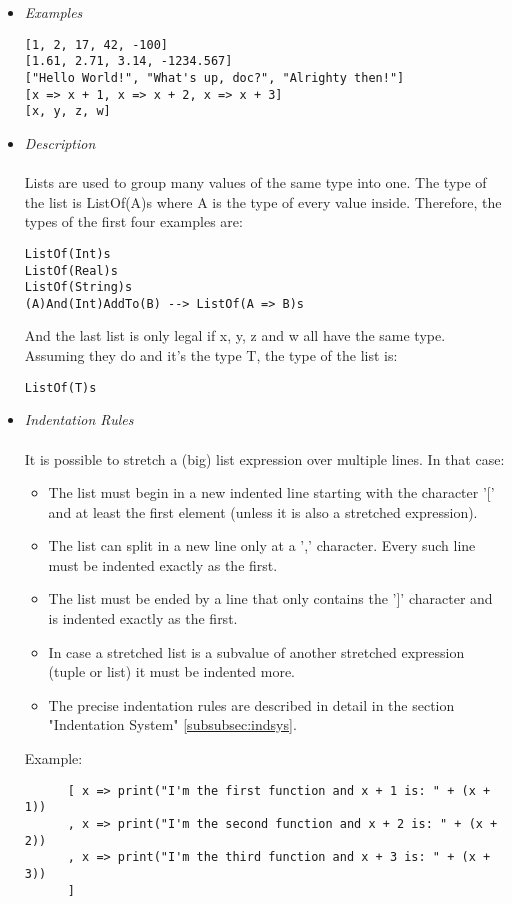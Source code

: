 \documentclass{article}
\begin{document}
\begin{itemize}

\item \textit{Examples}
\begin{verbatim}
[1, 2, 17, 42, -100]
[1.61, 2.71, 3.14, -1234.567]
["Hello World!", "What's up, doc?", "Alrighty then!"]
[x => x + 1, x => x + 2, x => x + 3]
[x, y, z, w]
\end{verbatim}

\item \textit{Description} \\\\
Lists are used to group many values of the same type into one. 
The type of the list is ListOf(A)s where A is the type of every value inside.
Therefore, the types of the first four examples are:
\begin{verbatim}
ListOf(Int)s
ListOf(Real)s
ListOf(String)s
(A)And(Int)AddTo(B) --> ListOf(A => B)s
\end{verbatim}
And the last list is only legal if x, y, z and w all have the same type. Assuming 
they do and it's the type T, the type of the list is: 
\begin{verbatim}
ListOf(T)s
\end{verbatim}

\item \textit{Indentation Rules} \\\\
It is possible to stretch a (big) list expression over multiple lines.
In that case:
\begin{itemize}
\item
The list must begin in a new indented line starting with the character '[' and 
at least the first element (unless it is also a stretched expression).

\item
The list can split in a new line only at a ',' character. Every such line must
be indented exactly as the first.

\item
The list must be ended by a line that only contains the ']' character and is 
indented exactly as the first.

\item
In case a stretched list is a subvalue of another stretched expression (tuple
or list) it must be indented more.

\item
The precise indentation rules are described in detail in the section
"Indentation System" \ref{subsubsec:indsys}.
\end{itemize}
Example:
\begin{verbatim}
      [ x => print("I'm the first function and x + 1 is: " + (x + 1))
      , x => print("I'm the second function and x + 2 is: " + (x + 2))
      , x => print("I'm the third function and x + 3 is: " + (x + 3))
      ]
\end{verbatim}


\end{itemize}
\end{document}
